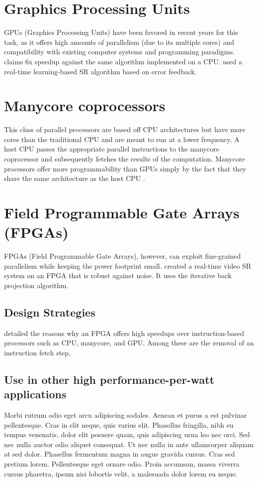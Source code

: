 \section{Graphics Processing Units}

GPUs (Graphics Processing Units) have been favored in recent years for this task, as it offers high amounts of parallelism (due to its multiple cores) and compatibility with existing computer systems and programming paradigms.
\cite{Wu2011} claims 6x speedup against the same algorithm implemented on a CPU. 
\cite{Shen2014} used a real-time learning-based SR algorithm based on error feedback. 

\section{Manycore coprocessors}
This class of parallel processors are based off CPU architectures but have more cores than the traditional CPU and are meant to run at a lower frequency. 
A host CPU passes the appropriate parallel instructions to the manycore coprocessor and subsequently fetches the results of the computation.
Manycore processors offer more programmability than GPUs simply by the fact that they share the same architecture as the host CPU \citep{Ishizaka2013}.

\section{Field Programmable Gate Arrays (FPGAs)}

FPGAs (Field Programmable Gate Arrays), however, can exploit fine-grained parallelism while keeping the power footprint small. \cite{Angelopoulou2009} created a real-time video SR system on an FPGA that is robust against noise. It uses the iterative back projection algorithm.

\subsection{Design Strategies}
\cite{Sirowy2008} detailed the reasons why an FPGA offers high speedups over instruction-based processors such as CPU, manycore, and GPU. 
Among these are the removal of an instruction fetch step, 

\subsection{Use in other high performance-per-watt applications}
Morbi rutrum odio eget arcu adipiscing sodales. Aenean et purus a est pulvinar pellentesque. Cras in elit neque, quis varius elit. Phasellus fringilla, nibh eu tempus venenatis, dolor elit posuere quam, quis adipiscing urna leo nec orci. Sed nec nulla auctor odio aliquet consequat. Ut nec nulla in ante ullamcorper aliquam at sed dolor. Phasellus fermentum magna in augue gravida cursus. Cras sed pretium lorem. Pellentesque eget ornare odio. Proin accumsan, massa viverra cursus pharetra, ipsum nisi lobortis velit, a malesuada dolor lorem eu neque.

